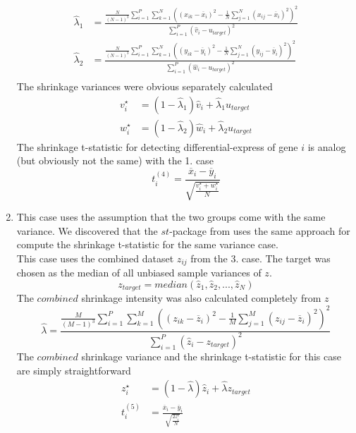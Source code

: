 \begin{enumerate}
	\begin{align*}
		\hat \lambda_1 &= \frac{\frac{N}{(N-1)^3}\sum^P_{i=1}\sum^N_{k=1}\left((x_{ik}-\overline{x}_i)^2 - \frac{1}{N}\sum_{j=1}^N(x_{ij}-\overline{x}_i)^2\right)^2}{\sum^P_{i=1}(\hat v_i - u_{target})^2}	 \\
		\hat \lambda_2 &= \frac{\frac{N}{(N-1)^3}\sum^P_{i=1}\sum^N_{k=1}\left((y_{ik}-\overline{y}_i)^2 - \frac{1}{N}\sum_{j=1}^N(y_{ij}-\overline{y}_i)^2\right)^2}{\sum^P_{i=1}(\hat w_i - u_{target})^2}	 \\
	\end{align*}
	The shrinkage variances were obvious separately calculated
	\begin{align*}
		v_i^\star &= (1-\hat \lambda_1)\hat v_i + \hat \lambda_1 u_{target} \\
		w_i^\star &= (1-\hat \lambda_2)\hat w_i + \hat \lambda_2 u_{target}
	\end{align*}
	The shrinkage t-statistic for detecting differential-express of gene $i$ is analog (but obviously not the same) with the 1. case
	\begin{equation*}
		t^{(4)}_i = \frac{\overline{x}_i - \overline{y}_i}{\sqrt{ \frac{v^\star_i+w^\star_i}{N} }}
	\end{equation*}
	\item This case uses the assumption that the two groups come with the same variance. We discovered that the $st$-package from \cite{OpgenRhein:2007p11} uses the same approach for compute the shrinkage t-statistic for the same variance case.\\
	This case uses the combined dataset $z_{ij}$ from the 3. case. The target was chosen as the median of all unbiased sample variances of $z$.
	\begin{equation*}
		z_{target} = median(\hat z_1, \hat z_2, ..., \hat z_N)
	\end{equation*}	
	The $combined$ shrinkage intensity was also calculated completely from $z$
	\begin{equation*}
	\hat \lambda = \frac{\frac{M}{(M-1)^3}\sum^P_{i=1}\sum^M_{k=1}\left((z_{ik}-\overline{z}_i)^2 - \frac{1}{M}\sum_{j=1}^M(z_{ij}-\overline{z}_i)^2\right)^2}{\sum^P_{i=1}(\hat z_i - z_{target})^2}
	\end{equation*}		
	The $combined$ shrinkage variance and the shrinkage t-statistic for this case are simply straightforward
	\begin{align*}
		z_i^\star &= (1-\hat \lambda)\hat z_i + \hat \lambda z_{target} \\
		t^{(5)}_i &= \frac{\overline{x}_i - \overline{y}_i}{\sqrt{ \frac{2z^\star_i}{N} }}
	\end{align*}
\end{enumerate}	
